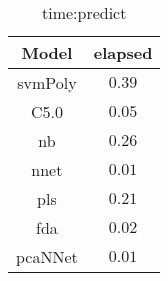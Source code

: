 \begin{table}[!ht]
	\centering
	\begin{tabular}{|c|c|}
		\hline
		Model & elapsed \\ \hline
		svmPoly & $0.39$ \\ \hline
		C5.0 & $0.05$ \\ \hline
		nb & $0.26$ \\ \hline
		nnet & $0.01$ \\ \hline
		pls & $0.21$ \\ \hline
		fda & $0.02$ \\ \hline
		pcaNNet & $0.01$ \\ \hline
	\end{tabular}
	\caption{time:predict}
	\label{tab:time:predict}
\end{table}
